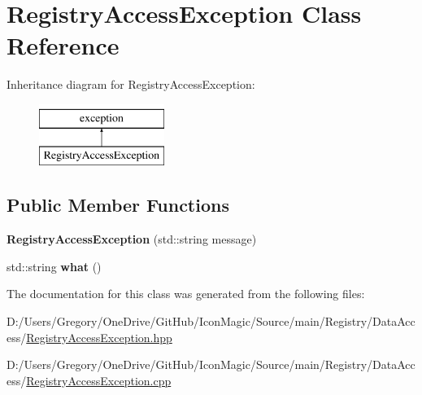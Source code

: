 \hypertarget{class_registry_access_exception}{}\section{Registry\+Access\+Exception Class Reference}
\label{class_registry_access_exception}
Inheritance diagram for Registry\+Access\+Exception\+:\begin{figure}[H]
\begin{center}
\leavevmode
\includegraphics[height=2.000000cm]{class_registry_access_exception}
\end{center}
\end{figure}
\subsection*{Public Member Functions}
\begin{DoxyCompactItemize}
\item 
\hypertarget{class_registry_access_exception_a1a85d7c94398af682f3b29a022cce704}{}{\bfseries Registry\+Access\+Exception} (std\+::string message)\label{class_registry_access_exception_a1a85d7c94398af682f3b29a022cce704}

\item 
\hypertarget{class_registry_access_exception_a4306a07dd787c0f82e215bd0cb061e09}{}std\+::string {\bfseries what} ()\label{class_registry_access_exception_a4306a07dd787c0f82e215bd0cb061e09}

\end{DoxyCompactItemize}


The documentation for this class was generated from the following files\+:\begin{DoxyCompactItemize}
\item 
D\+:/\+Users/\+Gregory/\+One\+Drive/\+Git\+Hub/\+Icon\+Magic/\+Source/main/\+Registry/\+Data\+Access/\hyperlink{_registry_access_exception_8hpp}{Registry\+Access\+Exception.\+hpp}\item 
D\+:/\+Users/\+Gregory/\+One\+Drive/\+Git\+Hub/\+Icon\+Magic/\+Source/main/\+Registry/\+Data\+Access/\hyperlink{_registry_access_exception_8cpp}{Registry\+Access\+Exception.\+cpp}\end{DoxyCompactItemize}
